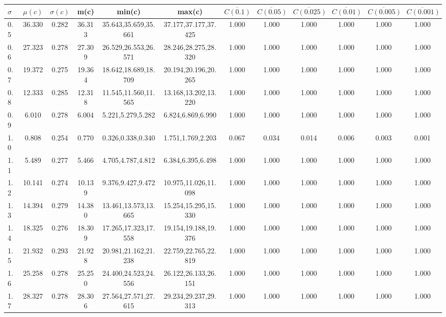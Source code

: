 \begin{table*}[h!]
\begin{center}
\begin{tabular}{| l | c | c | c | c | c | c | c | c | c | c | c |}\hline
$\sigma$ & $\mu(c)$ & $\sigma(c)$ & m(c) & min(c) & max(c) & $\overline{C(0.1)}$ & $\overline{C(0.05)}$ & $\overline{C(0.025)}$ & $\overline{C(0.01)}$ & $\overline{C(0.005)}$ & $\overline{C(0.001)}$ \\\hline
0.5 & 36.330 & 0.282 & 36.313 & 35.643,35.659,35.661 & 37.177,37.177,37.425  & 1.000  & 1.000  & 1.000  & 1.000  & 1.000  & 1.000 \\\hline
0.6 & 27.323 & 0.278 & 27.309 & 26.529,26.553,26.571 & 28.246,28.275,28.320  & 1.000  & 1.000  & 1.000  & 1.000  & 1.000  & 1.000 \\\hline
0.7 & 19.372 & 0.275 & 19.364 & 18.642,18.689,18.709 & 20.194,20.196,20.265  & 1.000  & 1.000  & 1.000  & 1.000  & 1.000  & 1.000 \\\hline
0.8 & 12.333 & 0.285 & 12.318 & 11.545,11.560,11.565 & 13.168,13.202,13.220  & 1.000  & 1.000  & 1.000  & 1.000  & 1.000  & 1.000 \\\hline
0.9 & 6.010 & 0.278 & 6.004 & 5.221,5.279,5.282 & 6.824,6.869,6.990  & 1.000  & 1.000  & 1.000  & 1.000  & 1.000  & 1.000 \\\hline
1.0 & 0.808 & 0.254 & 0.770 & 0.326,0.338,0.340 & 1.751,1.769,2.203  & 0.067  & 0.034  & 0.014  & 0.006  & 0.003  & 0.001 \\\hline
1.1 & 5.489 & 0.277 & 5.466 & 4.705,4.787,4.812 & 6.384,6.395,6.498  & 1.000  & 1.000  & 1.000  & 1.000  & 1.000  & 1.000 \\\hline
1.2 & 10.141 & 0.274 & 10.139 & 9.376,9.427,9.472 & 10.975,11.026,11.098  & 1.000  & 1.000  & 1.000  & 1.000  & 1.000  & 1.000 \\\hline
1.3 & 14.394 & 0.279 & 14.380 & 13.461,13.573,13.665 & 15.254,15.295,15.330  & 1.000  & 1.000  & 1.000  & 1.000  & 1.000  & 1.000 \\\hline
1.4 & 18.325 & 0.276 & 18.309 & 17.265,17.323,17.558 & 19.154,19.188,19.376  & 1.000  & 1.000  & 1.000  & 1.000  & 1.000  & 1.000 \\\hline
1.5 & 21.932 & 0.293 & 21.928 & 20.981,21.162,21.238 & 22.759,22.765,22.819  & 1.000  & 1.000  & 1.000  & 1.000  & 1.000  & 1.000 \\\hline
1.6 & 25.258 & 0.278 & 25.250 & 24.400,24.523,24.556 & 26.122,26.133,26.151  & 1.000  & 1.000  & 1.000  & 1.000  & 1.000  & 1.000 \\\hline
1.7 & 28.327 & 0.278 & 28.306 & 27.564,27.571,27.615 & 29.234,29.237,29.313  & 1.000  & 1.000  & 1.000  & 1.000  & 1.000  & 1.000 \\\hline

\end{tabular}
\end{center}
\end{table*}
